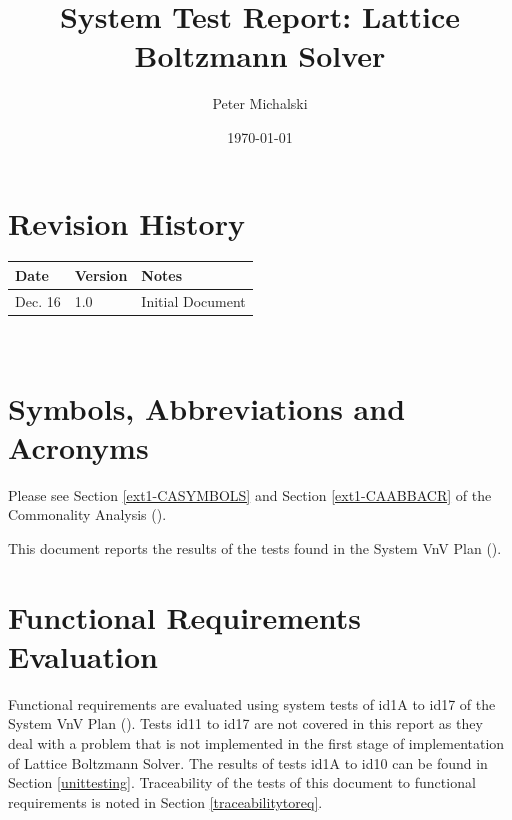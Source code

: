 \documentclass[12pt, titlepage]{article}
\newcommand{\myprogname}{Lattice Boltzmann Solver}
\begin{document}
\title{System Test Report: \myprogname} 
\author{Peter Michalski}
\date{\today}
	
\maketitle


\section{Revision History}

\begin{tabularx}{\textwidth}{p{3cm}p{2cm}X}
\toprule {\bf Date} & {\bf Version} & {\bf Notes}\\
\midrule
Dec. 16 & 1.0 & Initial Document\\
\bottomrule
\end{tabularx}

~\newpage

\section{Symbols, Abbreviations and Acronyms}

Please see Section \ref{ext1-CASYMBOLS} and Section \ref{ext1-CAABBACR} of the Commonality Analysis (\citet{LBM_CA_PM}).

\newpage

\tableofcontents

\listoftables %

\listoffigures %

\newpage


This document reports the results of the tests found in the System VnV Plan (\citet{LBM_SVNV_PM}).

\section{Functional Requirements Evaluation}

Functional requirements are evaluated using system tests of id1A to id17 of the System VnV Plan (\citet{LBM_SVNV_PM}). Tests id11 to id17 are not covered in this report as they deal with a problem that is not implemented in the first stage of implementation of {\myprogname}. The results of tests id1A to id10 can be found in Section \ref{unittesting}. Traceability of the tests of this document to functional requirements is noted in Section \ref{traceabilitytoreq}. 
\end{document}
